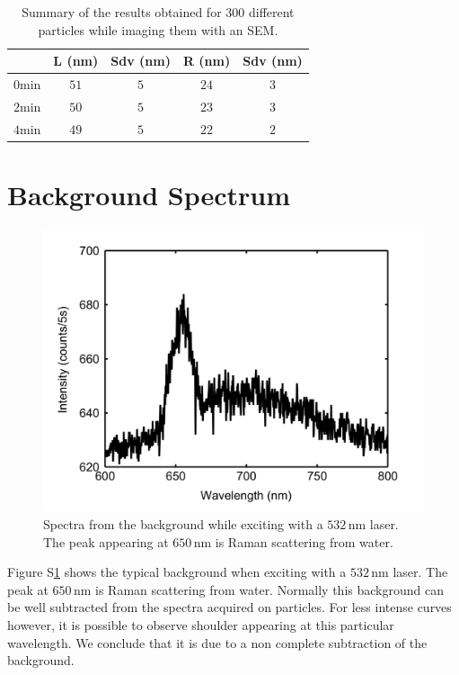 \documentclass[a4paper,oneside,onecolumn]{article}
\newcommand{\nm}{\ensuremath{\,\textrm{nm}}}
\begin{document}
\begin{table}[htp]
\begin{tabular*}{0.48\textwidth}{c c c c c}
 $\,$ & L (nm) & Sdv (nm) & R (nm) & Sdv (nm) \\\hline
 $0\textrm{min}$ & $51$ & $5$ & $24$ & $3$ \\
 $2\textrm{min}$ & $50$ & $5$ & $23$ & $3$ \\
 $4\textrm{min}$ & $49$ & $5$ & $22$ & $2$ \\
\end{tabular*}
\label{tab:SEM_results}
\caption{Summary of the results obtained for 300 different particles while
imaging them with an SEM.}
\end{table}

\section{Background Spectrum}
\begin{figure}[htp]
 \centering
 \includegraphics[width=0.95\linewidth]{Figures/04_Supporting/03_Background/background.png}
 \caption{Spectra from the background while exciting with a $532\nm$ laser. The
 peak appearing at $650\nm$ is Raman scattering from water.}
 \label{fig:Background}
\end{figure}

Figure S\ref{fig:Background} shows the typical background when exciting with a
$532\nm$ laser. The peak at $650\nm$ is Raman scattering from water. Normally
this background can be well subtracted from the spectra acquired on particles.
For less intense curves however, it is possible to observe shoulder appearing
at this particular wavelength. We conclude that it is due to a non complete
subtraction of the background.
\end{document}
